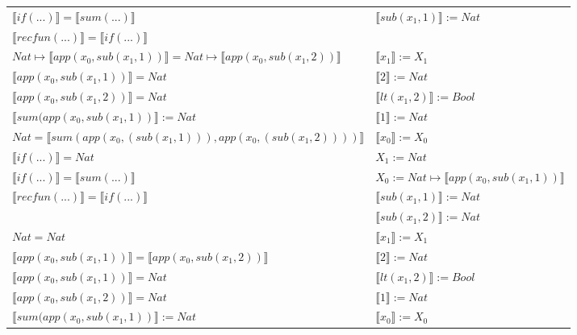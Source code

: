 \begin{exercise}
\begin{description}
\begin{center}
\begin{longtable}{ | l | l | }
                        $ \llbracket if(...) \rrbracket =  \llbracket sum(...) \rrbracket$ & $ \llbracket sub(x_1,1) \rrbracket := Nat$\\
                        $ \llbracket recfun(...) \rrbracket =  \llbracket if(...) \rrbracket$ & \\
                    \hline
                        $Nat \mapsto  \llbracket app(x_0, sub(x_1,1)) \rrbracket = Nat \mapsto  \llbracket app(x_0, sub(x_1,2)) \rrbracket$ & $ \llbracket x_1 \rrbracket := X_1$\\
                        $ \llbracket app(x_0, sub(x_1,1)) \rrbracket = Nat$ & $ \llbracket 2 \rrbracket := Nat$\\
                        $ \llbracket app(x_0, sub(x_1,2)) \rrbracket = Nat$ & $ \llbracket lt(x_1 , 2) \rrbracket := Bool$\\
                        $ \llbracket sum(app(x_0, sub(x_1,1)) \rrbracket := Nat$ &  $ \llbracket 1 \rrbracket := Nat$\\
                        $Nat =  \llbracket sum(app(x_0, (sub(x_1,1))), app(x_0, (sub(x_1,2)))) \rrbracket$ & $ \llbracket x_0 \rrbracket := X_0$\\
                        $ \llbracket if(...) \rrbracket = Nat$ & $X_1 := Nat$\\
                        $ \llbracket if(...) \rrbracket =  \llbracket sum(...) \rrbracket$ & $X_0 := Nat \mapsto  \llbracket app(x_0, sub(x_1,1)) \rrbracket$\\
                        $ \llbracket recfun(...) \rrbracket =  \llbracket if(...) \rrbracket$ & $ \llbracket sub(x_1,1) \rrbracket := Nat$\\
                        & $ \llbracket sub(x_1,2) \rrbracket := Nat$ \\
                    \hline
                        $Nat = Nat$ & $ \llbracket x_1 \rrbracket := X_1$\\
			     $ \llbracket app(x_0, sub(x_1,1)) \rrbracket =  \llbracket app(x_0, sub(x_1,2)) \rrbracket$ & $ \llbracket 2 \rrbracket := Nat$\\
                        $ \llbracket app(x_0, sub(x_1,1)) \rrbracket = Nat$ &  $ \llbracket lt(x_1 , 2) \rrbracket := Bool$\\
                        $ \llbracket app(x_0, sub(x_1,2)) \rrbracket = Nat$ &  $ \llbracket 1 \rrbracket := Nat$\\
                        $ \llbracket sum(app(x_0, sub(x_1,1)) \rrbracket := Nat$ &  $ \llbracket x_0 \rrbracket := X_0$\\

\end{longtable}
\end{center}
\end{description}
\end{exercise}
